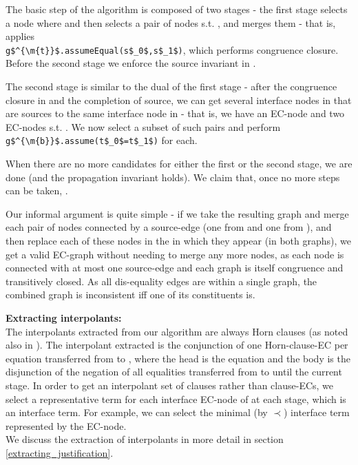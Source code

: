 The basic step of the algorithm is composed of two stages - the first stage selects a node  where  and then selects a pair of nodes 
 s.t. , and merges them - that is, applies \\
\lstinline|g$^{\m{t}}$.assumeEqual(s$_0$,s$_1$)|, which performs congruence closure.
Before the second stage we enforce the source invariant in .

The second stage is similar to the dual of the first stage - after the congruence closure in  and the completion of source, we can get several interface nodes in  that are sources to the same interface node in  - that is,
we have an EC-node  and two EC-nodes  s.t. . 
We now select a subset of such pairs  and perform \lstinline|g$^{\m{b}}$.assume(t$_0$=t$_1$)| for each.

When there are no more candidates for either the first or the second stage, we are done (and the propagation invariant holds). 
We claim that, once no more steps can be taken, .

Our informal argument is quite simple - if we take the resulting graph and merge each pair of nodes connected by a source-edge (one from  and one from ), and then replace each of these nodes in the \GFAs{} in which they appear (in both graphs), 
we get a valid EC-graph without needing to merge any more nodes, as each node is connected with at most one source-edge and each graph is itself congruence and transitively closed. As all dis-equality edges are within a single graph, the combined graph is inconsistent iff one of its constituents is.


\textbf{Extracting interpolants:}\\
The interpolants extracted from our algorithm are always Horn clauses (as noted also in \cite{FuchsGoelGrundyKrsticTinelli2012}).
The interpolant extracted is the conjunction of one Horn-clause-EC per equation transferred from  to , 
where the head is the equation and the body is the disjunction of the negation of all equalities transferred from  to  until the current stage. In order to get an interpolant set of clauses rather than clause-ECs, we select a representative term for each interface EC-node of  at each stage, which is an interface term. For example, we can select the minimal (by $\prec$) interface term represented by the EC-node.\\
We discuss the extraction of interpolants in more detail in section \ref{extracting_justification}.

